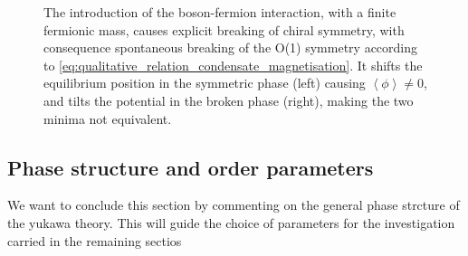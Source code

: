 \begin{figure}[h]
\centering
\begin{minipage}{0.45\textwidth}
\end{minipage}
\hfill
\begin{minipage}{0.45\textwidth}
\end{minipage}
\label{fig:breaking_O1_symmetry}
\caption[Classical potential and symmetry breaking]{The introduction of the boson-fermion interaction, with a finite fermionic mass, causes explicit breaking of chiral symmetry, with consequence spontaneous breaking of the O(1) symmetry according to \eqref{eq:qualitative_relation_condensate_magnetisation}. It shifts the equilibrium position in the symmetric phase (left) causing $\left\langle \phi \right\rangle \neq 0$, and tilts the potential in the broken phase (right), making the two minima not equivalent.}
\end{figure}
\subsection{Phase structure and order parameters}
We want to conclude this section by commenting on the general phase strcture of the yukawa theory. This will guide the choice of parameters for the investigation carried in the remaining sectios

\newpage
